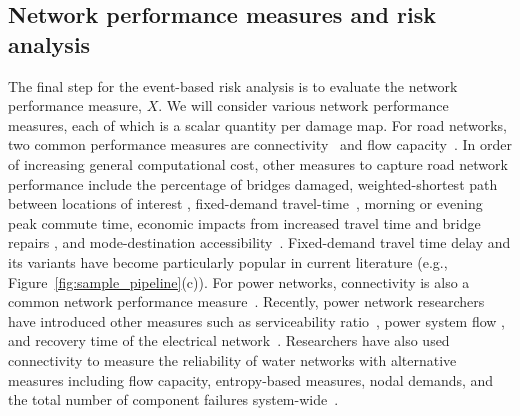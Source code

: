 \subsection{Network performance measures and risk analysis} \label{sec:net}
The final step for the event-based risk analysis is to evaluate the network performance measure, $X$. We will consider various network performance measures, each of which is a scalar quantity per damage map.  
For road networks, two common performance measures are connectivity~\cite{basoz_bridge_1995,rokneddin_bridge_2013} and flow capacity~\cite{lee_post-hazard_2011}.  In order of increasing general computational cost, other measures to capture road network performance include the percentage of bridges damaged, weighted-shortest path between locations of interest \cite{chang_measuring_2001}, fixed-demand travel-time~\cite{stergiou_treatment_2006,shiraki_system_2007,jayaram_efficient_2010,han_probabilistic_2012}, morning or evening peak commute time, economic impacts from increased travel time and bridge repairs \cite{stergiou_treatment_2006}, and mode-destination accessibility~\cite{handy_measuring_1997}.  Fixed-demand travel time delay and its variants have become particularly popular in current literature (e.g., Figure~\ref{fig:sample_pipeline}{\color{red}(c)}).
For power networks, connectivity is also a common network performance measure~\cite{duenas-osorio_seismic_2007}. Recently, power network researchers have introduced other measures such as serviceability ratio~\cite{adachi_serviceability_2008}, power system flow \cite{winkler_performance_2010}, and recovery time of the electrical network~\cite{shinozuka_seismic_2007}.
Researchers have also used connectivity to measure the reliability of water networks with alternative measures including flow capacity, entropy-based measures, nodal demands, and the total number of component failures system-wide~\cite{romero_seismic_2010,hernandez-fajardo_sequential_2011,goulter_analytical_1995}.

